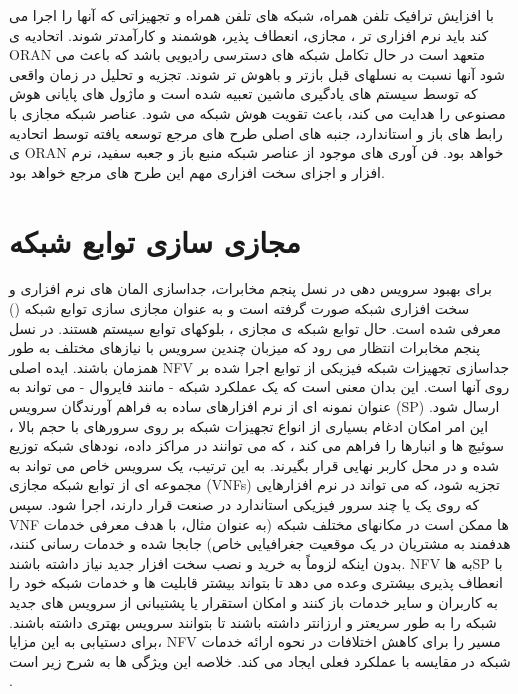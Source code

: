   با افزایش ترافیک تلفن همراه، شبکه های تلفن همراه و تجهیزاتی که آنها را اجرا می کند باید نرم افزاری تر ، مجازی، انعطاف پذیر، هوشمند و کارآمدتر شوند.
اتحادیه ی ORAN متعهد است در حال تکامل شبکه های دسترسی رادیویی باشد که باعث می شود آنها نسبت به نسلهای قبل بازتر و باهوش تر شوند.
تجزیه و تحلیل در زمان واقعی که توسط سیستم های یادگیری ماشین تعبیه شده است و ماژول های پایانی هوش مصنوعی را هدایت می کند، باعث تقویت هوش شبکه می شود.
عناصر شبکه مجازی با رابط های باز و استاندارد، جنبه های اصلی طرح های مرجع توسعه یافته توسط اتحادیه ی ORAN خواهد بود.
فن آوری های موجود از عناصر شبکه منبع باز و جعبه سفید، نرم افزار و اجزای سخت افزاری مهم این طرح های مرجع خواهد بود.
\section{مجازی سازی توابع شبکه}
برای بهبود سرویس دهی در نسل پنجم مخابرات، جداسازی المان های نرم افزاری و سخت افزاری شبکه صورت گرفته است و به عنوان 
مجازی سازی توابع شبکه () 
معرفی شده است.
  حال توابع شبکه ی مجازی
   ،
  بلوکهای توابع سیستم هستند.
در نسل پنجم مخابرات 
  انتظار می رود که
   میزبان چندین سرویس
   با نیازهای مختلف به طور همزمان
    باشند.
    ایده اصلی NFV جداسازی تجهیزات شبکه فیزیکی از توابع اجرا شده بر روی آنها است. این بدان معنی است که یک عملکرد شبکه - مانند فایروال - می تواند به عنوان نمونه ای از نرم افزارهای ساده به فراهم آورندگان سرویس (SP)  ارسال شود.
    این امر امکان ادغام بسیاری از انواع تجهیزات شبکه بر روی سرورهای با حجم بالا ، سوئیچ ها و انبارها را فراهم می کند ، که می توانند در مراکز داده، نودهای شبکه توزیع شده و در محل کاربر نهایی قرار بگیرند.
    به این ترتیب، یک سرویس خاص می تواند به مجموعه ای از توابع شبکه مجازی (VNFs) تجزیه شود، که می تواند در نرم افزارهایی که روی یک یا چند سرور فیزیکی استاندارد در صنعت قرار دارند، اجرا شود.
    سپس VNF ها ممکن است در مکانهای مختلف شبکه (به عنوان مثال، با هدف معرفی خدمات هدفمند به مشتریان در یک موقعیت جغرافیایی خاص) جابجا شده و خدمات رسانی کنند، بدون اینکه لزوماً به خرید و نصب سخت افزار جدید نیاز داشته باشند.
    NFV به 
     هاSP
   با انعطاف پذیری بیشتری وعده می دهد تا بتواند بیشتر قابلیت ها و خدمات شبکه خود را به کاربران و سایر خدمات باز کنند و امکان استقرار یا پشتیبانی از سرویس های جدید شبکه را  به طور سریعتر و ارزانتر داشته باشند تا بتوانند  سرویس بهتری داشته باشند.
   برای دستیابی به این مزایا، NFV مسیر را برای کاهش اختلافات در نحوه ارائه خدمات شبکه در مقایسه با عملکرد فعلی ایجاد می کند. خلاصه این ویژگی ها به شرح زیر است
   \cite{NFV}.
